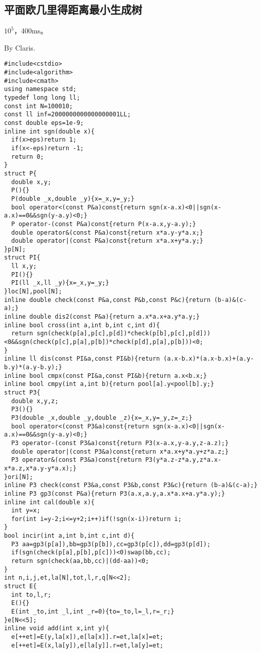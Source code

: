\documentclass[12pt]{ctexart}
\begin{document}
\subsection{平面欧几里得距离最小生成树}

$10^5$，400ms。

By Claris.

\begin{lstlisting}
#include<cstdio>
#include<algorithm>
#include<cmath>
using namespace std;
typedef long long ll;
const int N=100010;
const ll inf=2000000000000000001LL;
const double eps=1e-9;
inline int sgn(double x){
  if(x>eps)return 1;
  if(x<-eps)return -1;
  return 0;
}
struct P{
  double x,y;
  P(){}
  P(double _x,double _y){x=_x,y=_y;}
  bool operator<(const P&a)const{return sgn(x-a.x)<0||sgn(x-a.x)==0&&sgn(y-a.y)<0;}
  P operator-(const P&a)const{return P(x-a.x,y-a.y);}
  double operator&(const P&a)const{return x*a.y-y*a.x;}
  double operator|(const P&a)const{return x*a.x+y*a.y;}
}p[N];
struct PI{
  ll x,y;
  PI(){}
  PI(ll _x,ll _y){x=_x,y=_y;}
}loc[N],pool[N];
inline double check(const P&a,const P&b,const P&c){return (b-a)&(c-a);}
inline double dis2(const P&a){return a.x*a.x+a.y*a.y;}
inline bool cross(int a,int b,int c,int d){
  return sgn(check(p[a],p[c],p[d])*check(p[b],p[c],p[d]))<0&&sgn(check(p[c],p[a],p[b])*check(p[d],p[a],p[b]))<0;
}
inline ll dis(const PI&a,const PI&b){return (a.x-b.x)*(a.x-b.x)+(a.y-b.y)*(a.y-b.y);}
inline bool cmpx(const PI&a,const PI&b){return a.x<b.x;}
inline bool cmpy(int a,int b){return pool[a].y<pool[b].y;}
struct P3{
  double x,y,z;
  P3(){}
  P3(double _x,double _y,double _z){x=_x,y=_y,z=_z;}
  bool operator<(const P3&a)const{return sgn(x-a.x)<0||sgn(x-a.x)==0&&sgn(y-a.y)<0;}
  P3 operator-(const P3&a)const{return P3(x-a.x,y-a.y,z-a.z);}
  double operator|(const P3&a)const{return x*a.x+y*a.y+z*a.z;}
  P3 operator&(const P3&a)const{return P3(y*a.z-z*a.y,z*a.x-x*a.z,x*a.y-y*a.x);}
}ori[N];
inline P3 check(const P3&a,const P3&b,const P3&c){return (b-a)&(c-a);}
inline P3 gp3(const P&a){return P3(a.x,a.y,a.x*a.x+a.y*a.y);}
inline int cal(double x){
  int y=x;
  for(int i=y-2;i<=y+2;i++)if(!sgn(x-i))return i;
}
bool incir(int a,int b,int c,int d){
  P3 aa=gp3(p[a]),bb=gp3(p[b]),cc=gp3(p[c]),dd=gp3(p[d]);
  if(sgn(check(p[a],p[b],p[c]))<0)swap(bb,cc);
  return sgn(check(aa,bb,cc)|(dd-aa))<0;
}
int n,i,j,et,la[N],tot,l,r,q[N<<2];
struct E{
  int to,l,r;
  E(){}
  E(int _to,int _l,int _r=0){to=_to,l=_l,r=_r;}
}e[N<<5];
inline void add(int x,int y){
  e[++et]=E(y,la[x]),e[la[x]].r=et,la[x]=et;
  e[++et]=E(x,la[y]),e[la[y]].r=et,la[y]=et;

\end{lstlisting}
\end{document}
